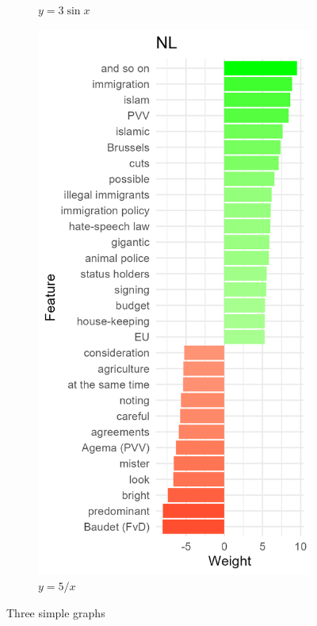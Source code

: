 \documentclass{article}
\begin{document}
\begin{figure}
\begin{subfigure}[b]{0.3\textwidth}
         \caption{$y=3\sin x$}
         \label{fig:three sin x}
     \end{subfigure}
     \hfill
     \begin{subfigure}[b]{0.3\textwidth}
         \centering
         \includegraphics[width=\textwidth]{NL/vis/NL_weights.png}
         \caption{$y=5/x$}
         \label{fig:five over x}
     \end{subfigure}
        \caption{Three simple graphs}
        \label{fig:three graphs}
\end{figure}
\end{document}
